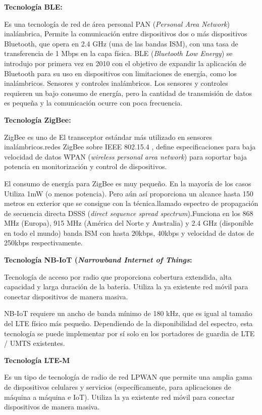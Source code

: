 \textbf{Tecnología BLE:}

Es una tecnología de red de área personal PAN (\textit{Personal Area Network}) inalámbrica, Permite la comunicación entre dispositivos dos o  más dispositivos Bluetooth, que opera en 2.4 GHz (una de las bandas ISM), con una tasa de transferencia de 1 Mbps en la capa física. BLE (\textit{Bluetooth Low Energy}) se introdujo por primera vez en 2010 con el objetivo de expandir la aplicación de Bluetooth para su uso en dispositivos con limitaciones de energía, como los inalámbricos. Sensores y controles inalámbricos. Los sensores y controles requieren un bajo consumo de energía, pero la cantidad de transmisión de datos es pequeña y la comunicación ocurre con poca frecuencia\citep{chang2014bluetooth}.


\textbf{Tecnología ZigBee:}

ZigBee es uno de El transceptor estándar más utilizado en sensores inalámbricos.redes ZigBee sobre IEEE 802.15.4 , define especificaciones para baja velocidad de datos WPAN (\textit{wireless personal area network}) para soportar baja potencia en monitorización y control de dispositivos\citep{ramya2011study}.

El consumo de energía para ZigBee es muy pequeño. En la mayoría de los casos Utiliza 1mW (o menos potencia). Pero aún así proporciona un alcance hasta 150 metros en exterior que se consigue con la técnica.llamado espectro de propagación de secuencia directa DSSS (\textit{direct sequence spread spectrum}).Funciona en los 868 MHz (Europa), 915 MHz (América del Norte y Australia) y 2.4 GHz (disponible en todo el mundo) banda ISM con hasta 20kbps, 40kbps y velocidad de datos de 250kbps respectivamente\citep{ramya2011study}.

\textbf{Tecnología NB-IoT (\textit{Narrowband Internet of Things}:}

Tecnología de acceso por radio que proporciona cobertura extendida, alta capacidad y larga duración de la batería. Utiliza la ya existente red móvil para conectar dispositivos de manera masiva.

NB-IoT requiere un ancho de banda mínimo de 180 kHz, que es igual al tamaño del LTE físico más pequeño.
Dependiendo de la disponibilidad del espectro, esta tecnología se puede implementar por sí solo en los portadores de guardia de LTE / UMTS existentes\citep{adhikary2016performance}.

\textbf{Tecnología LTE-M}

Es un tipo de tecnología de radio de red LPWAN que permite una amplia gama de dispositivos celulares y servicios (específicamente, para aplicaciones de máquina a máquina e IoT). Utiliza la ya existente red móvil para conectar dispositivos de manera masiva.

